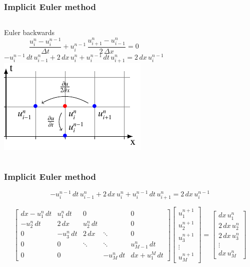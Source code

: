 \begin{frame}
  \frametitle{Implicit Euler method}
  \begin{columns}
    Euler backwards
    $$\frac{u_{i}^{n}-u_{i}^{n-1}}{\Delta t}+ u_{i}^{n-1}\, \frac{u_{i+1}^{n}-u_{i-1}^{n}}{2\,\Delta x}=0$$
$$-u_{i}^{n-1} \, dt \, u_{i-1}^{n} +  2 \, dx \,  u_{i}^{n} + u_{i}^{n-1} \, dt \, u_{i+1}^{n}=  2 \, dx \, u_{i}^{n-1}$$
    \includegraphics[height=.9\textheight]{../BurgersEquation/tikz/implicit/implicit.pdf}\\
  \end{columns}
\end{frame}

\begin{frame}
  \frametitle{Implicit Euler method}
  $$-u_{i}^{n-1} \, dt \, u_{i-1}^{n} +  2 \, dx \,  u_{i}^{n} + u_{i}^{n-1} \, dt \, u_{i+1}^{n}=  2 \, dx \, u_{i}^{n-1}$$

  $$  \left[{\begin{matrix}
    {dx- u_{1}^{n}\, dt}&{ u_{1}^{n} \, dt}&{0}&{}&{0}\\[5pt]
    {-u_{2}^{n} \, dt}&{ 2 \, dx}&{ u_{2}^{n} \, dt}&{}&{0}\\[5pt]
    {0}&{-u_{3}^{n} \, dt}&{ 2 \, dx}&\ddots &{0}\\[5pt]
    {0}&{0}&\ddots &\ddots &{ u_{M-1}^{n} \, dt}\\[5pt]
    {0}&{0}&{}&{-u_{M}^{n} \, dt}&{dx + u_{1}^{M}\, dt}
    \end{matrix}}
    \right]\left[{
    \begin{matrix}
    { u_{1}^{n+1}}\\[5pt]
    { u_{2}^{n+1}}\\[5pt]
    { u_{3}^{n+1}}\\[5pt]
    \vdots \\[5pt]
    { u_{M}^{n+1}}
    \end{matrix}}
    \right]
    =\left[{
    \begin{matrix}
    {dx \, u_{1}^{n}}\\[5pt]
    { 2 \, dx \, u_{2}^{n}}\\[5pt]
    { 2 \, dx \, u_{3}^{n}}\\[5pt]
    \vdots \\[5pt]
    {dx \, u_{M}^{n}}
    \end{matrix}}
    \right]$$
\end{frame}


